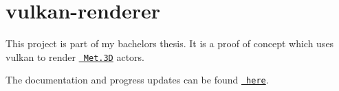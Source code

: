 \chapter{vulkan-\/renderer}
\hypertarget{index}{}\label{index}
\label{index_md__c_1_2_users_2_joshu_2_c_lion_projects_2vulkan-renderer_2_r_e_a_d_m_e}%
%


This project is part of my bachelor\textquotesingle{}s thesis. It is a proof of concept which uses vulkan to render \href{https://collaboration.cen.uni-hamburg.de/display/Met3D/Welcome+to+Met.3D}{\texttt{ Met.\+3D}} actors.

The documentation and progress updates can be found \href{https://JcK-l.github.io/vulkan-renderer/}{\texttt{ here}}. 